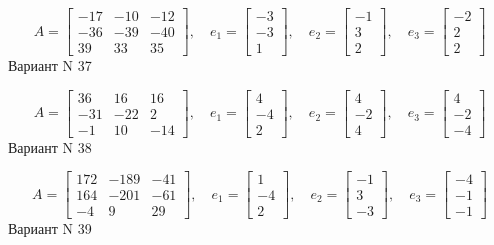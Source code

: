 \documentclass[11pt]{report}
\begin{document}
$$A = \left[\begin{matrix}-17 & -10 & -12\\-36 & -39 & -40\\39 & 33 & 35\end{matrix}\right],\quad e_1 = \left[\begin{matrix}-3\\-3\\1\end{matrix}\right],\quad e_2 = \left[\begin{matrix}-1\\3\\2\end{matrix}\right],\quad e_3 = \left[\begin{matrix}-2\\2\\2\end{matrix}\right]$$Вариант N 37

$$A = \left[\begin{matrix}36 & 16 & 16\\-31 & -22 & 2\\-1 & 10 & -14\end{matrix}\right],\quad e_1 = \left[\begin{matrix}4\\-4\\2\end{matrix}\right],\quad e_2 = \left[\begin{matrix}4\\-2\\4\end{matrix}\right],\quad e_3 = \left[\begin{matrix}4\\-2\\-4\end{matrix}\right]$$Вариант N 38

$$A = \left[\begin{matrix}172 & -189 & -41\\164 & -201 & -61\\-4 & 9 & 29\end{matrix}\right],\quad e_1 = \left[\begin{matrix}1\\-4\\2\end{matrix}\right],\quad e_2 = \left[\begin{matrix}-1\\3\\-3\end{matrix}\right],\quad e_3 = \left[\begin{matrix}-4\\-1\\-1\end{matrix}\right]$$Вариант N 39
\end{document}
